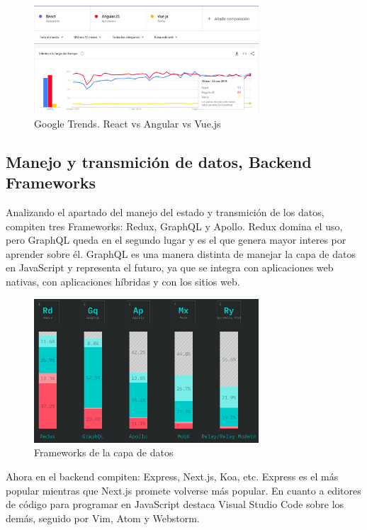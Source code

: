 \documentclass[twocolumns,a4paper]{IEEEtran}
\begin{document}
\begin{figure}[ht]
   \centering
      \includegraphics[width=3.3in]{./pictures/Trends_react_Angular_Vue.png}
   \caption{Google Trends. React vs Angular vs Vue.js}
   \label{fig:trendsRAV}
\end{figure}

\subsection{Manejo y transmición de datos, Backend Frameworks}
Analizando el apartado del manejo del estado y transmición de los datos,
compiten tres Frameworks: Redux, GraphQL y Apollo. Redux domina el uso, pero
GraphQL queda en el segundo lugar y es el que genera mayor interes por aprender
sobre él. GraphQL es una manera distinta de manejar la capa de datos en
JavaScript y representa el futuro, ya que se integra con aplicaciones web
nativas, con aplicaciones híbridas y con los sitios web.\\

\begin{figure}[ht]
   \centering
      \includegraphics[width=3.3in]{./pictures/data_layer.png}
   \caption{Frameworks de la capa de datos}
   \label{fig:data_layer}
\end{figure}

Ahora en el backend compiten: Express, Next.js, Koa, etc. Express es el más
popular mientras que Next.js promete volverse más popular.
En cuanto a editores de código para programar en JavaScript destaca Visual
Studio Code sobre los demás, seguido por Vim, Atom y Webstorm.
\end{document}
